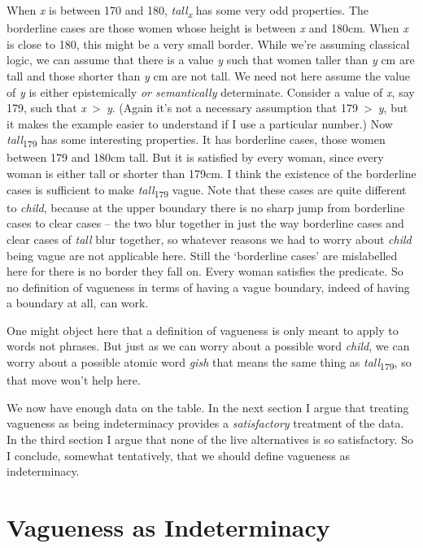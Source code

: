 \documentclass[
  11pt,
  letterpaper,
  DIV=11,
  numbers=noendperiod,
  twoside]{scrartcl}
\begin{document}
When \emph{x} is between 170 and 180, \emph{tall\textsubscript{x}} has
some very odd properties. The borderline cases are those women whose
height is between \emph{x} and 180cm. When \emph{x} is close to 180,
this might be a very small border. While we're assuming classical logic,
we can assume that there is a value \emph{y} such that women taller than
\emph{y} cm are tall and those shorter than \emph{y} cm are not tall. We
need not here assume the value of \emph{y} is either epistemically
\emph{or semantically} determinate. Consider a value of \emph{x}, say
179, such that \emph{x}~\textgreater~\emph{y}. (Again it's not a
necessary assumption that 179~\textgreater~\emph{y}, but it makes the
example easier to understand if I use a particular number.) Now
\emph{tall}\textsubscript{179} has some interesting properties. It has
borderline cases, those women between 179 and 180cm tall. But it is
satisfied by every woman, since every woman is either tall or shorter
than 179cm. I think the existence of the borderline cases is sufficient
to make \emph{tall}\textsubscript{179} vague. Note that these cases are
quite different to \emph{child}, because at the upper boundary there is
no sharp jump from borderline cases to clear cases -- the two blur
together in just the way borderline cases and clear cases of \emph{tall}
blur together, so whatever reasons we had to worry about \emph{child}
being vague are not applicable here. Still the `borderline cases' are
mislabelled here for there is no border they fall on. Every woman
satisfies the predicate. So no definition of vagueness in terms of
having a vague boundary, indeed of having a boundary at all, can work.

One might object here that a definition of vagueness is only meant to
apply to words not phrases. But just as we can worry about a possible
word \emph{child}, we can worry about a possible atomic word \emph{gish}
that means the same thing as \emph{tall}\textsubscript{179}, so that
move won't help here.

We now have enough data on the table. In the next section I argue that
treating vagueness as being indeterminacy provides a \emph{satisfactory}
treatment of the data. In the third section I argue that none of the
live alternatives is so satisfactory. So I conclude, somewhat
tentatively, that we should define vagueness as indeterminacy.

\section{Vagueness as Indeterminacy}\label{vagueness-as-indeterminacy}
\end{document}
